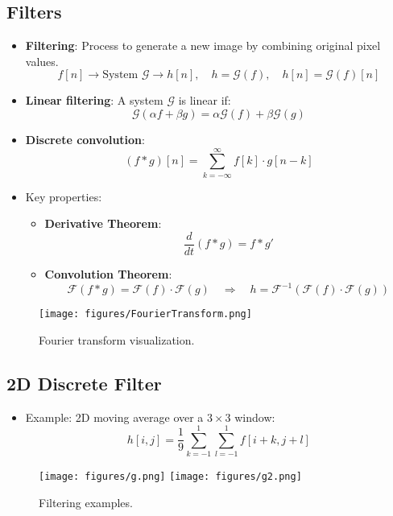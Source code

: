 \subsection{Filters}
\begin{itemize}
    \item \textbf{Filtering}: Process to generate a new image by combining original pixel values.
    $$
    f[n] \rightarrow \text{System } \mathcal{G} \rightarrow h[n], \quad h = \mathcal{G}(f), \quad h[n] = \mathcal{G}(f)[n]
    $$
    \item \textbf{Linear filtering}: A system $ \mathcal{G} $ is linear if:
    $$
    \mathcal{G}(\alpha f + \beta g) = \alpha \mathcal{G}(f) + \beta \mathcal{G}(g)
    $$
    \item \textbf{Discrete convolution}:
    $$
    (f * g)[n] = \sum_{k=-\infty}^{\infty} f[k] \cdot g[n - k]
    $$
    \item Key properties:
    \begin{itemize}
        \item \textbf{Derivative Theorem}: $$\frac{d}{dt}(f * g) = f * g'$$
        \item \textbf{Convolution Theorem}: 
        $$
        \mathcal{F}(f * g) = \mathcal{F}(f) \cdot \mathcal{F}(g) \quad \Rightarrow \quad h = \mathcal{F}^{-1}(\mathcal{F}(f) \cdot \mathcal{F}(g))
        $$
    \end{itemize}
\end{itemize}

\begin{figure}[htbp]
    \centering
    \texttt{[image: figures/FourierTransform.png]}
    \caption{Fourier transform visualization.}
\end{figure}

\clearpage

\subsection{2D Discrete Filter}
\begin{itemize}
    \item Example: 2D moving average over a $ 3 \times 3 $ window:
    $$
    h[i,j] = \frac{1}{9} \sum_{k=-1}^{1} \sum_{l=-1}^{1} f[i+k, j+l]
    $$
\end{itemize}

\begin{figure}[htbp]
    \centering
    \texttt{[image: figures/g.png]}
    \texttt{[image: figures/g2.png]}
    \caption{Filtering examples.}
\end{figure}

